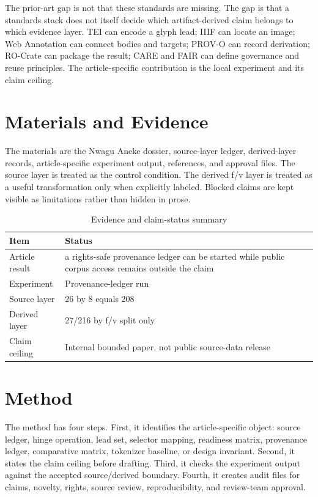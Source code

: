 \documentclass[sigconf,nonacm]{acmart}
\begin{document}
The prior-art gap is not that these standards are missing. The gap is that a
standards stack does not itself decide which artifact-derived claim belongs to
which evidence layer. TEI can encode a glyph lead; IIIF can locate an image;
Web Annotation can connect bodies and targets; PROV-O can record derivation;
RO-Crate can package the result; CARE and FAIR can define governance and reuse
principles. The article-specific contribution is the local experiment and its
claim ceiling.

\section{Materials and Evidence}
The materials are the Nwagu Aneke dossier, source-layer ledger, derived-layer
records, article-specific experiment output, references, and approval files.
The source layer is treated as the control condition. The derived f/v layer is
treated as a useful transformation only when explicitly labeled. Blocked claims
are kept visible as limitations rather than hidden in prose.


\begin{table}[t]
\caption{Evidence and claim-status summary}
\label{tab:article_na_007}
\begin{tabular}{p{}p{}}
\toprule
Item & Status \\
\midrule
Article result & a rights-safe provenance ledger can be started while public corpus access remains outside the claim \\
Experiment & Provenance-ledger run \\
Source layer & 26 by 8 equals 208 \\
Derived layer & 27/216 by f/v split only \\
Claim ceiling & Internal bounded paper, not public source-data release \\
\bottomrule
\end{tabular}
\end{table}


\section{Method}
The method has four steps. First, it identifies the article-specific object:
source ledger, hinge operation, lead set, selector mapping, readiness matrix,
provenance ledger, comparative matrix, tokenizer baseline, or design invariant.
Second, it states the claim ceiling before drafting. Third, it checks the
experiment output against the accepted source/derived boundary. Fourth, it
creates audit files for claims, novelty, rights, source review, reproducibility,
and review-team approval.
\end{document}
